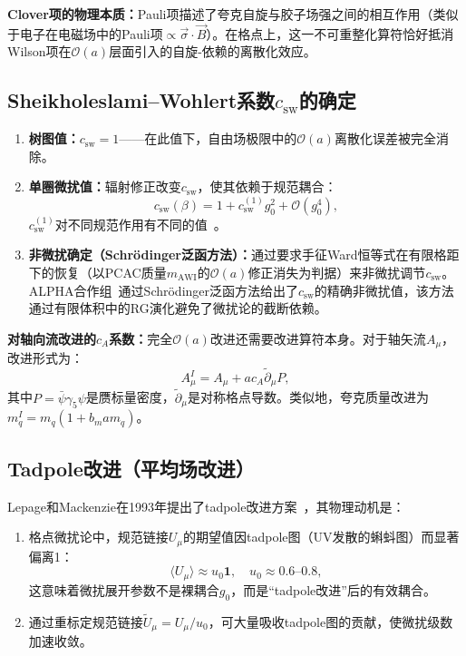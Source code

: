 \documentclass[12pt,a4paper]{ctexart}
\theoremstyle{definition}
\begin{document}
\textbf{Clover项的物理本质：}Pauli项描述了夸克自旋与胶子场强之间的相互作用（类似于电子在电磁场中的Pauli项$\propto \vec\sigma\cdot\vec B$）。在格点上，这一不可重整化算符恰好抵消Wilson项在$\mathcal{O}(a)$层面引入的自旋-依赖的离散化效应。

\subsection{Sheikholeslami--Wohlert系数$c_{\text{sw}}$的确定}

\begin{enumerate}[leftmargin=*]
    \item \textbf{树图值：}$c_{\text{sw}} = 1$——在此值下，自由场极限中的$\mathcal{O}(a)$离散化误差被完全消除。
    \item \textbf{单圈微扰值：}辐射修正改变$c_{\text{sw}}$，使其依赖于规范耦合：
    \begin{equation}
    c_{\text{sw}}(\beta) = 1 + c_{\text{sw}}^{(1)} g_0^2 + \mathcal{O}(g_0^4),
    \label{eq:csw_perturbative}
    \end{equation}
    $c_{\text{sw}}^{(1)}$对不同规范作用有不同的值~\cite{Wohlert1987}。
    \item \textbf{非微扰确定（Schr\"odinger泛函方法）：}通过要求手征Ward恒等式在有限格距下的恢复（以PCAC质量$m_{\text{AWI}}$的$\mathcal{O}(a)$修正消失为判据）来非微扰调节$c_{\text{sw}}$。ALPHA合作组~\cite{Luscher1996SF}通过Schr\"odinger泛函方法给出了$c_{\text{sw}}$的精确非微扰值，该方法通过有限体积中的RG演化避免了微扰论的截断依赖。
\end{enumerate}

\textbf{对轴向流改进的$c_A$系数：}完全$\mathcal{O}(a)$改进还需要改进算符本身。对于轴矢流$A_\mu$，改进形式为：
\begin{equation}
A_\mu^I = A_\mu + a c_A \tilde\partial_\mu P,
\label{eq:improved_axial}
\end{equation}
其中$P = \bar\psi\gamma_5\psi$是赝标量密度，$\tilde\partial_\mu$是对称格点导数。类似地，夸克质量改进为$m_q^I = m_q(1 + b_m a m_q)$。

\subsection{Tadpole改进（平均场改进）}

Lepage和Mackenzie在1993年提出了tadpole改进方案~\cite{LepageMackenzie1993}，其物理动机是：

\begin{enumerate}
    \item 格点微扰论中，规范链接$U_\mu$的期望值因tadpole图（UV发散的蝌蚪图）而显著偏离1：
    \begin{equation}
    \langle U_\mu \rangle \approx u_0 \mathbf{1}, \quad u_0 \approx 0.6\text{--}0.8,
    \label{eq:u0_tadpole}
    \end{equation}
    这意味着微扰展开参数不是裸耦合$g_0$，而是``tadpole改进''后的有效耦合。
    \item 通过重标定规范链接$\tilde U_\mu = U_\mu/u_0$，可大量吸收tadpole图的贡献，使微扰级数加速收敛。
\end{enumerate}
\end{document}

